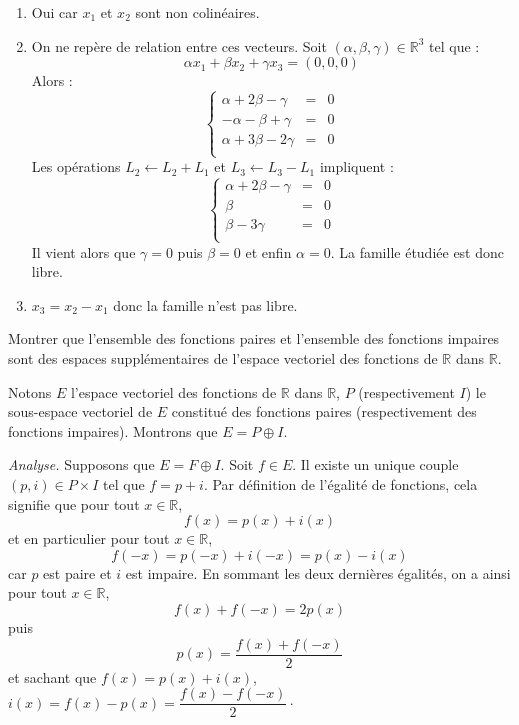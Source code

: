 \documentclass[a4paper,10pt]{report}
\begin{document}
\begin{enumerate}
\item Oui car $x_1$ et $x_2$ sont non colinéaires.
\item On ne repère de relation entre ces vecteurs. Soit $(\alpha, \beta, \gamma) \in \mathbb{R}^3$ tel que :
$$ \alpha x_1 + \beta x_2 + \gamma x_3 = (0,0,0)$$
Alors :
$$ \left\lbrace \begin{array}{ccl}
\alpha + 2 \beta - \gamma & = & 0 \\
- \alpha - \beta + \gamma & = & 0 \\
\alpha+ 3 \beta -2 \gamma & = & 0 \\
\end{array}\right.$$
Les opérations $L_2 \leftarrow L_2+L_1$ et $L_3 \leftarrow L_3- L_1$ impliquent :
$$ \left\lbrace \begin{array}{rcl}
\alpha + 2 \beta - \gamma & = & 0 \\
  \beta & = & 0 \\
  \beta -3 \gamma & = & 0 \\
\end{array}\right.$$
Il vient alors que $\gamma=0$ puis $\beta=0$ et enfin $\alpha=0$. La famille étudiée est donc libre.
\item $x_3=x_2-x_1$ donc la famille n'est pas libre.
\end{enumerate}

\begin{Exercice}{} Montrer que l'ensemble des fonctions paires et l'ensemble des fonctions impaires sont des espaces supplémentaires de l'espace vectoriel des fonctions de $\mathbb{R}$ dans $\mathbb{R}$. 
\end{Exercice}

\corr Notons $E$ l'espace vectoriel des fonctions de $\mathbb{R}$ dans $\mathbb{R}$, $P$ (respectivement $I$) le sous-espace vectoriel de $E$ constitué des fonctions paires (respectivement des fonctions impaires). Montrons que $E= P \oplus I$.

\medskip

\noindent \textit{Analyse.} Supposons que $E= F \oplus I$. Soit $f \in E$. Il existe un unique couple $(p,i) \in P \times I$ tel que $f=p + i$. Par définition de l'égalité de fonctions, cela signifie que pour tout $x \in \mathbb{R}$,
$$ f(x) = p(x)+i(x)$$
et en particulier pour tout $x \in \mathbb{R}$,
$$ f(-x) = p(-x)+i(-x) = p(x)-i(x)$$
car $p$ est paire et $i$ est impaire. En sommant les deux dernières égalités, on a ainsi pour tout $x \in \mathbb{R}$,
$$ f(x)+f(-x) = 2p(x) $$
puis
$$ p(x) = \frac{f(x)+f(-x)}{2}$$
et sachant que $f(x)=p(x)+i(x)$, $i(x)=f(x)-p(x) = \dfrac{f(x)-f(-x)}{2}\cdot$
\end{document}
